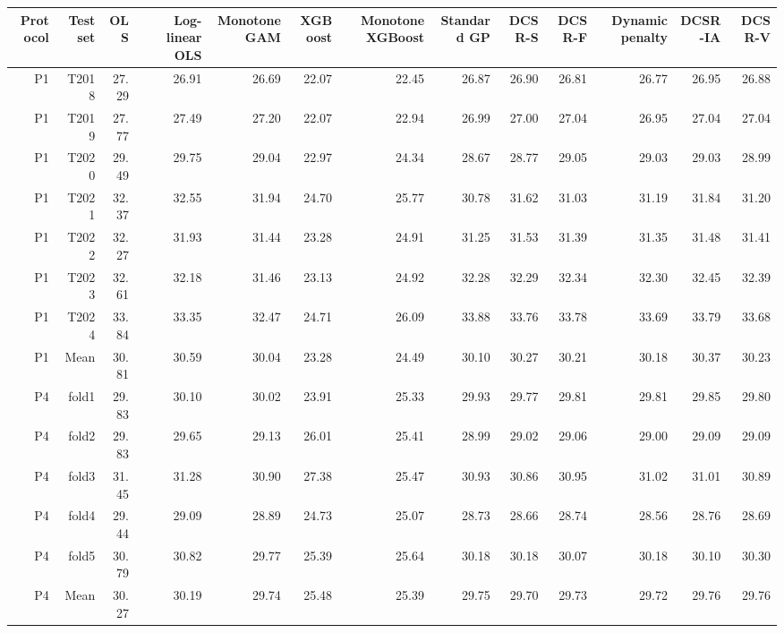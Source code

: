 \begin{tabular}{rrrrrrrrrrrrr}
\hline
Protocol & Test set & OLS & Log-linear OLS & Monotone GAM & XGBoost & Monotone XGBoost & Standard GP & DCSR-S & DCSR-F & Dynamic penalty & DCSR-IA & DCSR-V \\
\hline
P1 & T2018 & 27.29 & 26.91 & 26.69 & 22.07 & 22.45 & 26.87 & 26.90 & 26.81 & 26.77 & 26.95 & 26.88 \\
P1 & T2019 & 27.77 & 27.49 & 27.20 & 22.07 & 22.94 & 26.99 & 27.00 & 27.04 & 26.95 & 27.04 & 27.04 \\
P1 & T2020 & 29.49 & 29.75 & 29.04 & 22.97 & 24.34 & 28.67 & 28.77 & 29.05 & 29.03 & 29.03 & 28.99 \\
P1 & T2021 & 32.37 & 32.55 & 31.94 & 24.70 & 25.77 & 30.78 & 31.62 & 31.03 & 31.19 & 31.84 & 31.20 \\
P1 & T2022 & 32.27 & 31.93 & 31.44 & 23.28 & 24.91 & 31.25 & 31.53 & 31.39 & 31.35 & 31.48 & 31.41 \\
P1 & T2023 & 32.61 & 32.18 & 31.46 & 23.13 & 24.92 & 32.28 & 32.29 & 32.34 & 32.30 & 32.45 & 32.39 \\
P1 & T2024 & 33.84 & 33.35 & 32.47 & 24.71 & 26.09 & 33.88 & 33.76 & 33.78 & 33.69 & 33.79 & 33.68 \\
P1 & Mean & 30.81 & 30.59 & 30.04 & 23.28 & 24.49 & 30.10 & 30.27 & 30.21 & 30.18 & 30.37 & 30.23 \\
P4 & fold1 & 29.83 & 30.10 & 30.02 & 23.91 & 25.33 & 29.93 & 29.77 & 29.81 & 29.81 & 29.85 & 29.80 \\
P4 & fold2 & 29.83 & 29.65 & 29.13 & 26.01 & 25.41 & 28.99 & 29.02 & 29.06 & 29.00 & 29.09 & 29.09 \\
P4 & fold3 & 31.45 & 31.28 & 30.90 & 27.38 & 25.47 & 30.93 & 30.86 & 30.95 & 31.02 & 31.01 & 30.89 \\
P4 & fold4 & 29.44 & 29.09 & 28.89 & 24.73 & 25.07 & 28.73 & 28.66 & 28.74 & 28.56 & 28.76 & 28.69 \\
P4 & fold5 & 30.79 & 30.82 & 29.77 & 25.39 & 25.64 & 30.18 & 30.18 & 30.07 & 30.18 & 30.10 & 30.30 \\
P4 & Mean & 30.27 & 30.19 & 29.74 & 25.48 & 25.39 & 29.75 & 29.70 & 29.73 & 29.72 & 29.76 & 29.76 \\
\hline
\end{tabular}
